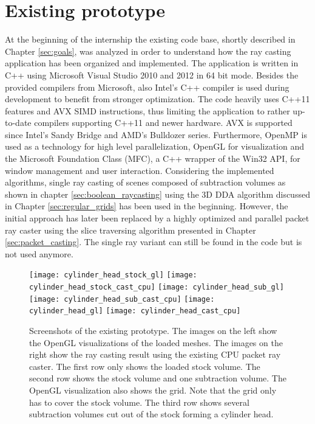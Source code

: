 \chapter{Existing prototype}
\label{sec:existing_prototype}

At the beginning of the internship the existing code base, shortly described in Chapter \ref{sec:goals}, was analyzed in order to understand how the ray casting application has been organized and implemented. The application is written in C++ using Microsoft Visual Studio 2010 and 2012 in 64 bit mode. Besides the provided compilers from Microsoft, also Intel's C++ compiler is used during development to benefit from stronger optimization. The code heavily uses C++11 features and AVX SIMD instructions, thus limiting the application to rather up-to-date compilers supporting C++11 and newer hardware. AVX is supported since Intel's Sandy Bridge and AMD's Bulldozer series. Furthermore, OpenMP is used as a technology for high level parallelization, OpenGL for visualization and the Microsoft Foundation Class (MFC), a C++ wrapper of the Win32 API, for window management and user interaction.
Considering the implemented algorithms, single ray casting of scenes composed of subtraction volumes as shown in chapter \ref{sec:boolean_raycasting} using the 3D DDA algorithm discussed in Chapter \ref{sec:regular_grids} has been used in the beginning. However, the initial approach has later been replaced by a highly optimized and parallel packet ray caster using the slice traversing algorithm presented in Chapter \ref{sec:packet_casting}. The single ray variant can still be found in the code but is not used anymore.

\begin{figure}[h]
\centering
\texttt{[image: cylinder\_head\_stock\_gl]}
\texttt{[image: cylinder\_head\_stock\_cast\_cpu]}
\texttt{[image: cylinder\_head\_sub\_gl]}
\texttt{[image: cylinder\_head\_sub\_cast\_cpu]}
\texttt{[image: cylinder\_head\_gl]}
\texttt{[image: cylinder\_head\_cast\_cpu]}
\caption[Screenshots of the existing prototype.]{Screenshots of the existing prototype. The images on the left show the OpenGL visualizations of the loaded meshes. The images on the right show the ray casting result using the existing CPU packet ray caster. The first row only shows the loaded stock volume. The second row shows the stock volume and one subtraction volume. The OpenGL visualization also shows the grid. Note that the grid only has to cover the stock volume. The third row shows several subtraction volumes cut out of the stock forming a cylinder head.}
\label{fig:cylinder_head}
\end{figure}

